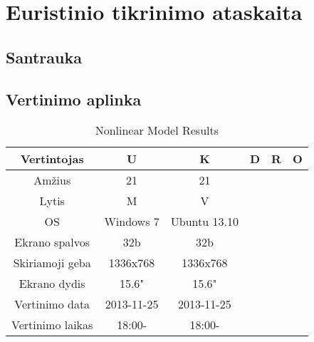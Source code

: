 \section{Euristinio tikrinimo ataskaita}

\subsection{Santrauka}
	
\subsection{Vertinimo aplinka}
	\begin{table}[ht] 
	\caption{Nonlinear Model Results} %
	\centering %
	\begin{tabular}{c c c c c c} %
	\hline\hline %
	Vertintojas & U & K & D & R & O \\ [0.5ex] %
	\hline %
	Amžius & 21 & 21\\ %
	Lytis & M & V\\
	OS & Windows 7 & Ubuntu 13.10\\
	Ekrano spalvos & 32b & 32b\\
	Skiriamoji geba & 1336x768 & 1336x768\\
	Ekrano dydis & 15.6" & 15.6"\\
	Vertinimo data & 2013-11-25 & 2013-11-25\\
	Vertinimo laikas & 18:00- & 18:00-\\
	\hline %
	\end{tabular} 
	\label{table:nonlin} %
	\end{table} 
	
